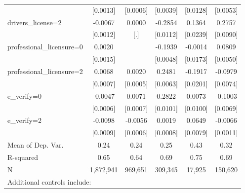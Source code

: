 \begin{table}[htbp]
\begin{tabular}{l*{5}{c}}
                    &    [0.0013]         &    [0.0006]         &    [0.0039]         &    [0.0128]         &    [0.0053]         \\
\addlinespace
drivers\_license=2   &     -0.0067\sym{***}&      0.0000         &     -0.2854\sym{***}&      0.1364\sym{***}&      0.2757\sym{***}\\
                    &    [0.0012]         &         [.]         &    [0.0112]         &    [0.0239]         &    [0.0090]         \\
\addlinespace
professional\_licensure=0&      0.0020         &                     &     -0.1939\sym{***}&     -0.0014         &      0.0809\sym{***}\\
                    &    [0.0015]         &                     &    [0.0048]         &    [0.0173]         &    [0.0050]         \\
\addlinespace
professional\_licensure=2&      0.0068\sym{***}&      0.0020\sym{***}&      0.2481\sym{***}&     -0.1917\sym{***}&     -0.0979\sym{***}\\
                    &    [0.0007]         &    [0.0005]         &    [0.0063]         &    [0.0201]         &    [0.0074]         \\
\addlinespace
e\_verify=0          &     -0.0047\sym{***}&      0.0071\sym{***}&      0.2822\sym{***}&      0.0073         &     -0.1003\sym{***}\\
                    &    [0.0006]         &    [0.0007]         &    [0.0101]         &    [0.0100]         &    [0.0069]         \\
\addlinespace
e\_verify=2          &     -0.0098\sym{***}&     -0.0056\sym{***}&      0.0019\sym{**} &      0.0649\sym{***}&     -0.0066\sym{***}\\
                    &    [0.0009]         &    [0.0006]         &    [0.0008]         &    [0.0079]         &    [0.0011]         \\
\midrule
Mean of Dep. Var.   &        0.24         &        0.24         &        0.25         &        0.43         &        0.32         \\
R-squared           &        0.65         &        0.64         &        0.69         &        0.75         &        0.69         \\
N                   &   1,872,941         &     969,651         &     309,345         &      17,925         &     150,620         \\
\bottomrule
\multicolumn{6}{l}{\footnotesize Additional controls include:}\\

\end{tabular}
\end{table}
